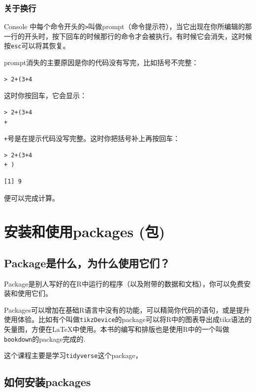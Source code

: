 \documentclass[]{book}
\begin{document}
\hypertarget{newline}{%
\subsubsection{关于换行}\label{newline}}

Console 中每个命令开头的\texttt{\textgreater{}}叫做prompt（命令提示符），当它出现在你所编辑的那一行的开头时，按下回车的时候那行的命令才会被执行。有时候它会消失，这时候按\texttt{esc}可以将其恢复。

prompt消失的主要原因是你的代码没有写完，比如括号不完整：

\begin{verbatim}
> 2+(3+4
\end{verbatim}

这时你按回车，它会显示：

\begin{verbatim}
> 2+(3+4
+
\end{verbatim}

\texttt{+}号是在提示代码没写完整。这时你把括号补上再按回车：

\begin{verbatim}
> 2+(3+4
+ )
\end{verbatim}

\begin{verbatim}
[1] 9
\end{verbatim}

便可以完成计算。

\hypertarget{packages}{%
\section{安装和使用packages (包)}\label{packages}}

\hypertarget{packages-what}{%
\subsection{Package是什么，为什么使用它们？}\label{packages-what}}

Package是别人写好的在R中运行的程序（以及附带的数据和文档），你可以免费安装和使用它们。

Packages可以增加在基础R语言中没有的功能，可以精简你代码的语句，或是提升使用体验。比如有个叫做\texttt{tikzDevice}的package可以将R中的图表导出成tikz语法的矢量图，方便在LaTeX中使用。本书的编写和排版也是使用R中的一个叫做\texttt{bookdown}的package完成的.

这个课程主要是学习\texttt{tidyverse}这个package，

\hypertarget{package-install}{%
\subsection{如何安装packages}\label{package-install}}
\end{document}
